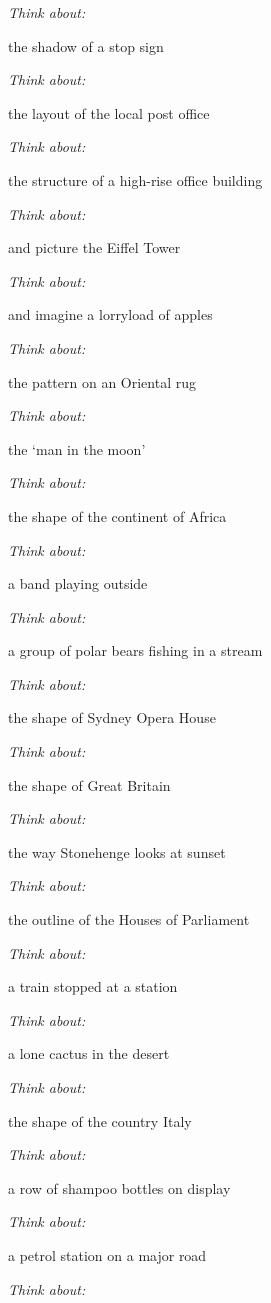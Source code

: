 \textit{Think about:}

the shadow of a stop sign 

\textit{Think about:}

the layout of the local post office

\textit{Think about:}

the structure of a high-rise office building

\textit{Think about:}

and picture the Eiffel Tower

\textit{Think about:}

and imagine a lorryload of apples

\textit{Think about:}

the pattern on an Oriental rug

\textit{Think about:}

the `man in the moon'

\textit{Think about:}

the shape of the continent of Africa

\textit{Think about:}

a band playing outside

\textit{Think about:}

a group of polar bears fishing in a stream

\textit{Think about:}

the shape of Sydney Opera House

\textit{Think about:}

the shape of Great Britain

\textit{Think about:}

the way Stonehenge looks at sunset

\textit{Think about:}

the outline of the Houses of Parliament

\textit{Think about:}

a train stopped at a station

\textit{Think about:}

a lone cactus in the desert

\textit{Think about:}

the shape of the country Italy

\textit{Think about:}

a row of shampoo bottles on display

\textit{Think about:}

a petrol station on a major road

\textit{Think about:}

